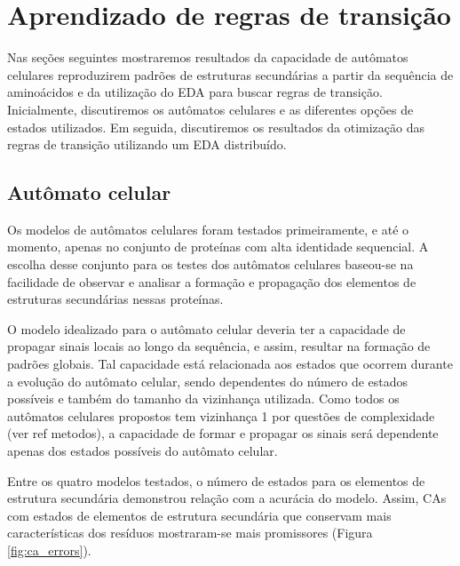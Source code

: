\chapter{Aprendizado de regras de transição}

Nas seções seguintes mostraremos resultados da capacidade de autômatos celulares reproduzirem padrões de estruturas secundárias a partir da sequência de aminoácidos e da utilização do EDA para buscar regras de transição. Inicialmente, discutiremos os autômatos celulares e as diferentes opções de estados utilizados. Em seguida, discutiremos os resultados da otimização das regras de transição utilizando um EDA distribuído.  


\section{Autômato celular}

Os modelos de autômatos celulares foram testados primeiramente, e até o momento, apenas no conjunto de proteínas com alta identidade sequencial. A escolha desse conjunto para os testes dos autômatos celulares baseou-se na facilidade de observar e analisar a formação e propagação dos elementos de estruturas secundárias nessas proteínas.

O modelo idealizado para o autômato celular deveria ter a capacidade de propagar sinais locais ao longo da sequência, e assim, resultar na formação de padrões globais. Tal capacidade está relacionada aos estados que ocorrem durante a evolução do autômato celular, sendo dependentes do número de estados possíveis e também do tamanho da vizinhança utilizada. Como todos os autômatos celulares propostos tem vizinhança 1 por questões de complexidade (ver ref metodos), a capacidade de formar e propagar os sinais será dependente apenas dos estados possíveis do autômato celular.

Entre os quatro modelos testados, o número de estados para os elementos de estrutura secundária demonstrou relação com a acurácia do modelo. Assim, CAs com estados de elementos de estrutura secundária que conservam mais características dos resíduos mostraram-se mais promissores (Figura \ref{fig:ca_errors}).


